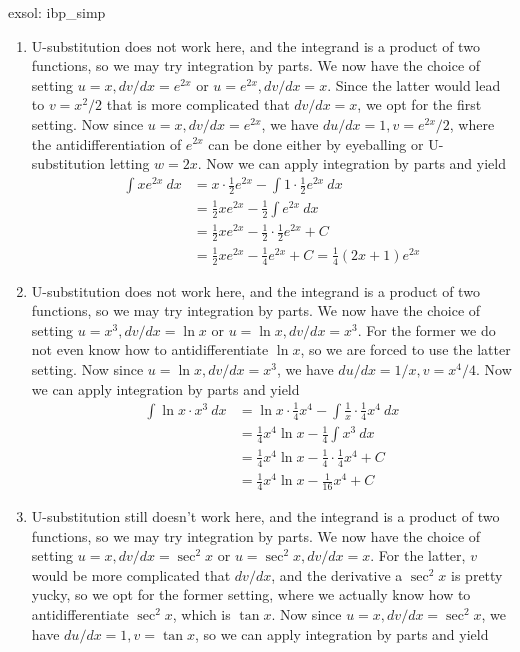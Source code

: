 \begin{exsol}[]{exsol: ibp_simp}
    \begin{enumerate}
        \item U-substitution does not work here, and the integrand is a product of two functions, so we may try integration by parts.  We now have the choice of setting $u = x, dv/dx = e^{2x}$ or $u = e^{2x}, dv/dx = x$.  Since the latter would lead to $v = x^2/2$ that is more complicated that $dv/dx = x$, we opt for the first setting.  Now since $u = x, dv/dx = e^{2x}$, we have $du/dx = 1, v = e^{2x}/2$, where the antidifferentiation of $e^{2x}$ can be done either by eyeballing or U-substitution letting $w = 2x$.  Now we can apply integration by parts and yield
        \begin{align*}
            \int xe^{2x}~dx &= x \cdot \frac{1}{2}e^{2x} - \int 1 \cdot \frac{1}{2}e^{2x}~dx\\
            &= \frac{1}{2}xe^{2x} - \frac{1}{2}\int e^{2x}~dx\\
            &= \frac{1}{2}xe^{2x} - \frac{1}{2}\cdot\frac{1}{2}e^{2x} + C\\
            &= \frac{1}{2}xe^{2x} - \frac{1}{4}e^{2x} + C = \frac{1}{4}(2x+1)e^{2x}
        \end{align*}
        \item U-substitution does not work here, and the integrand is a product of two functions, so we may try integration by parts.  We now have the choice of setting $u = x^3, dv/dx = \ln x$ or $u = \ln x, dv/dx = x^3$.  For the former we do not even know how to antidifferentiate $\ln x$, so we are forced to use the latter setting.  Now since $u = \ln x, dv/dx = x^3$, we have $du/dx = 1/x, v = x^4/4$.  Now we can apply integration by parts and yield
        \begin{align*}
            \int \ln x \cdot x^3~dx &= \ln x \cdot \frac{1}{4}x^4 - \int \frac{1}{x} \cdot \frac{1}{4}x^4~dx\\
            &= \frac{1}{4}x^4\ln x - \frac{1}{4}\int x^3~dx\\
            &= \frac{1}{4}x^4\ln x - \frac{1}{4}\cdot \frac{1}{4}x^4 + C\\
            &= \frac{1}{4}x^4\ln x - \frac{1}{16}x^4 + C
        \end{align*}
        \item U-substitution still doesn't work here, and the integrand is a product of two functions, so we may try integration by parts.  We now have the choice of setting $u = x, dv/dx = \sec^2 x$ or $u = \sec^2 x, dv/dx = x$.  For the latter, $v$ would be more complicated that $dv/dx$, and the derivative a $\sec^2 x$ is pretty yucky, so we opt for the former setting, where we actually know how to antidifferentiate $\sec^2 x$, which is $\tan x$.  Now since $u = x, dv/dx = \sec^2 x$, we have $du/dx = 1, v = \tan x$, so we can apply integration by parts and yield

\end{enumerate}
\end{exsol}
